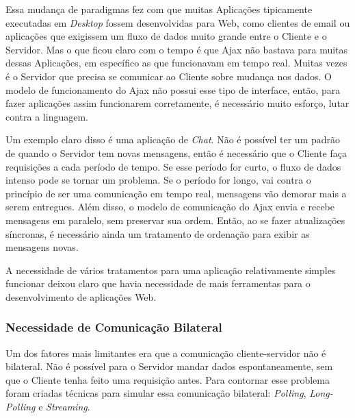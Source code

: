 \documentclass[a4paper,12pt]{article}
\begin{document}
Essa mudança de paradigmas fez com que muitas Aplicações tipicamente executadas em \emph{Desktop} fossem desenvolvidas para Web, como clientes de email ou aplicações que exigissem um fluxo de dados muito grande entre o Cliente e o Servidor. Mas o que ficou claro com o tempo é que Ajax não bastava para muitas dessas Aplicações, em específico as que funcionavam em tempo real. Muitas vezes é o Servidor que precisa se comunicar ao Cliente sobre mudança nos dados. O modelo de funcionamento do Ajax não possui esse tipo de interface, então, para fazer aplicações assim funcionarem corretamente, é necessário muito esforço, lutar contra a linguagem.

Um exemplo claro disso é uma aplicação de \emph{Chat}. Não é possível ter um padrão de quando o Servidor tem novas mensagens, então é necessário que o Cliente faça requisições a cada período de tempo. Se esse período for curto, o fluxo de dados intenso pode se tornar um problema. Se o período for longo, vai contra o princípio de ser uma comunicação em tempo real, mensagens vão demorar mais a serem entregues. Além disso, o modelo de comunicação do Ajax envia e recebe mensagens em paralelo, sem preservar sua ordem. Então, ao se fazer atualizações síncronas, é necessário ainda um tratamento de ordenação para exibir as mensagens novas.

A necessidade de vários tratamentos para uma aplicação relativamente simples funcionar deixou claro que havia necessidade de mais ferramentas para o desenvolvimento de aplicações Web.


\subsubsection{Necessidade de Comunicação Bilateral}

Um dos fatores mais limitantes era que a comunicação cliente-servidor não é bilateral. Não é possível para o Servidor mandar dados espontaneamente, sem que o Cliente tenha feito uma requisição antes. Para contornar esse problema foram criadas técnicas para simular essa comunicação bilateral: \emph{Polling}, \emph{Long-Polling} e \emph{Streaming}.
\end{document}
